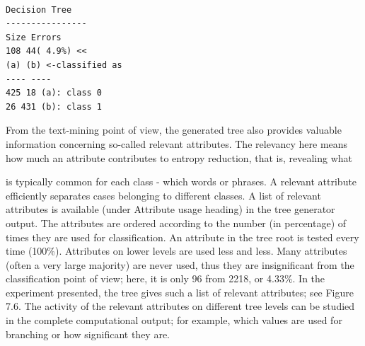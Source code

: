 \documentclass[11pt,openany,executivepaper]{book}
\begin{document}
\begin{verbatim}

Decision Tree
----------------
Size Errors
108 44( 4.9%) <<
(a) (b) <-classified as
---- ----
425 18 (a): class 0
26 431 (b): class 1
\end{verbatim}

From the text-mining point of view, the generated tree also provides valuable
information concerning so-called relevant attributes. The relevancy here means
how much an attribute contributes to entropy reduction, that is, revealing what

is typically common for each class - which words or phrases. A relevant attribute efficiently separates cases belonging to different classes. A list of relevant
attributes is available (under Attribute usage heading) in the tree generator
output. The attributes are ordered according to the number (in percentage) of
times they are used for classification. An attribute in the tree root is tested every
time (100\%). Attributes on lower levels are used less and less. Many attributes
(often a very large majority) are never used, thus they are insignificant from the
classification point of view; here, it is only 96 from 2218, or 4.33\%. In the experiment presented, the tree gives such a list of relevant attributes; see Figure 7.6.
The activity of the relevant attributes on different tree levels can be studied
in the complete computational output; for example, which values are used for
branching or how significant they are.
\end{document}
